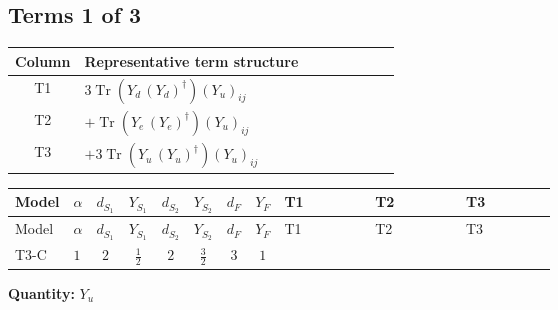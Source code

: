 \documentclass[8pt]{article}
\begin{document}
\begin{landscape}
\subsection*{Terms 1 of 3}
\begin{center}
\begin{tabular}{@{}c >{\raggedright\arraybackslash}p{0.82\linewidth}@{}}
\toprule
Column & Representative term structure \\
\midrule
T1 & \(\displaystyle 3 \operatorname{Tr}\!\left({Y_d}\,\left({Y_d}\right)^{\dagger}\right) \left({Y_u}\right)_{ij}\) \\
\midrule
T2 & \(\displaystyle +\operatorname{Tr}\!\left({Y_e}\,\left({Y_e}\right)^{\dagger}\right) \left({Y_u}\right)_{ij}\) \\
\midrule
T3 & \(\displaystyle +3 \operatorname{Tr}\!\left({Y_u}\,\left({Y_u}\right)^{\dagger}\right) \left({Y_u}\right)_{ij}\) \\
\midrule
\bottomrule
\end{tabular}
\end{center}
\smallskip
\tiny
\begin{longtable}{@{}llcccccc >{\raggedright\arraybackslash}p{0.21\linewidth} >{\raggedright\arraybackslash}p{0.21\linewidth} >{\raggedright\arraybackslash}p{0.21\linewidth}@{}}
\toprule
Model & $\alpha$ & $d_{S_1}$ & $Y_{S_1}$ & $d_{S_2}$ & $Y_{S_2}$ & $d_F$ & $Y_F$ & T1 & T2 & T3 \\
\midrule
\endfirsthead
\toprule
Model & $\alpha$ & $d_{S_1}$ & $Y_{S_1}$ & $d_{S_2}$ & $Y_{S_2}$ & $d_F$ & $Y_F$ & T1 & T2 & T3 \\
\midrule
\endhead
T3-C & $1$ & $2$ & $\frac{1}{2}$ & $2$ & $\frac{3}{2}$ & $3$ & $1$ & \scriptsize\adjustbox{max width=\linewidth}{$\begin{gathered} 3 \operatorname{Tr}\!\left({Y_d}\,\left({Y_d}\right)^{\dagger}\right) \left({Y_u}\right)_{ij}\end{gathered}$} & \scriptsize\adjustbox{max width=\linewidth}{$\begin{gathered} +\operatorname{Tr}\!\left({Y_e}\,\left({Y_e}\right)^{\dagger}\right) \left({Y_u}\right)_{ij}\end{gathered}$} & \scriptsize\adjustbox{max width=\linewidth}{$\begin{gathered} +3 \operatorname{Tr}\!\left({Y_u}\,\left({Y_u}\right)^{\dagger}\right) \left({Y_u}\right)_{ij}\end{gathered}$} \\
\midrule
\bottomrule
\end{longtable}
\clearpage
\noindent\textbf{Quantity: }$Y_u$\par\smallskip

\end{landscape}
\end{document}
